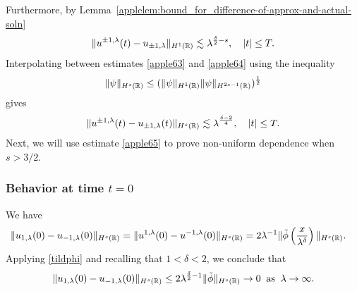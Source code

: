 %
%
Furthermore, by 
Lemma~\ref{applelem:bound_for_difference-of-approx-and-actual-soln} 
%
%
\begin{equation}
\begin{split}
\|u^{\pm 1, \lambda}(t) - u_{\pm 1, \lambda} \|_{H^1(\mathbb{R})} \lesssim
\lambda^{\frac{\delta}{2} -s}, \quad |t| \le T.
\label{apple64}
\end{split}
\end{equation}
%
%
%
%
%
%
%
%
Interpolating between estimates \eqref{apple63} and \eqref{apple64} using 
the inequality
\begin{equation*}
\label{apple403}
\|\psi \|_{H^s (\mathbb{R})} \leq  (\| \psi \|_{H^1 (\mathbb{R})} \| \psi
\|_{H^{2s-1}(\mathbb{R})})^\frac12
\end{equation*}
%
%
gives
%
%
\begin{equation}
\begin{split}
\|u^{\pm 1, \lambda}(t) - u_{\pm 1, \lambda}(t)
\|_{H^s(\mathbb{R})}
\lesssim \lambda^{\frac{\delta -2}{4}}, \quad |t| \le T.
\label{apple65}
\end{split}
\end{equation}
%
%
Next, we will use estimate \eqref{apple65} to prove non-uniform
dependence when $s > 3/2$.
\subsubsection{Behavior at time $t=0$}  We have
%
%
%
%
\begin{equation*}
\begin{split}
\|u_{1,\lambda}(0) - u_{-1,\lambda}(0) \|_{H^s(\mathbb{R})} & = \|u^{1,\lambda}(0) 
- u^{-1,\lambda}(0) \|_{H^s(\mathbb{R})}
= 2 \lambda^{-1} \| \tilde{\phi}\left( \frac{x}{\lambda^\delta}
\right) \|_{H^s(\mathbb{R})}.
\label{apple}
\end{split}
\end{equation*}
%
%
%
%
Applying \eqref{tildphi} and recalling that $1<\delta<2$, we conclude that
%
%
\begin{equation}
\begin{split}
\|u_{1,\lambda}(0) - u_{-1,\lambda}(0) \|_{H^s(\mathbb{R})} \le 2
\lambda^{\frac{\delta}{2}-1} \|\tilde{\phi} \|_{H^s(\mathbb{R})} \to 0
\; \; \text{as} \; \; \lambda \to \infty.
\label{apple70}
\end{split}
\end{equation}
%
%
%
%
%  
%

